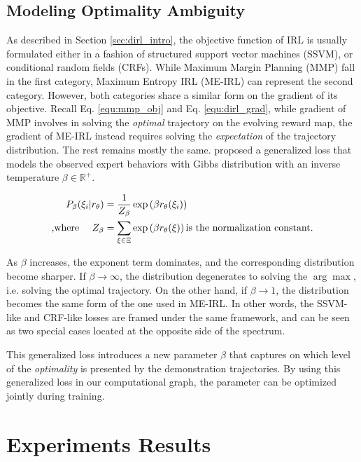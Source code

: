 \documentclass[../thesis.tex]{subfiles}
\begin{document}
\subsection{Modeling Optimality Ambiguity}

As described in Section \ref{sec:dirl_intro}, the objective function of IRL is usually formulated either in a fashion of structured support vector machines (SSVM), or conditional random fields (CRFs). 
While Maximum Margin Planning (MMP) fall in the first category, Maximum Entropy IRL (ME-IRL) can represent the second category. 
However, both categories share a similar form on the gradient of its objective. 
Recall Eq. \ref{equ:mmp_obj} and Eq. \ref{equ:dirl_grad}, while gradient of MMP involves in solving the \textit{optimal} trajectory on the evolving reward map, the gradient of ME-IRL instead requires solving the \textit{expectation} of the trajectory distribution. 
The rest remains mostly the same.
\citet{pletscher2010entropy} proposed a generalized loss that models the observed expert behaviors with Gibbs distribution with an inverse temperature $\beta \in \mathbb R^{+}$. 

\begin{align}
P_{\beta}(\xi_i | r_\theta) &= \frac{1}{Z_\beta} \exp \left( \beta r_\theta(\xi_i) \right) \\
\text{,where \quad} Z_\beta &= \sum_{\xi \in \Xi} \exp \left( \beta r_\theta(\xi) \right) \text{is the normalization constant.}
\end{align}

As $\beta$ increases, the exponent term dominates, and the corresponding distribution become sharper. 
If $\beta \to \infty$, the distribution degenerates to solving the $\arg\max$, i.e. solving the optimal trajectory. 
On the other hand, if $\beta \to 1$, the distribution becomes the same form of the one used in ME-IRL.
In other words, the SSVM-like and CRF-like losses are framed under the same framework, and can be seen as two special cases located at the opposite side of the spectrum. 

This generalized loss introduces a new parameter $\beta$ that captures on which level of the \textit{optimality} is presented by the demonstration trajectories. By using this generalized loss in our computational graph, the parameter can be optimized jointly during training.

\section{Experiments Results}
\end{document}
